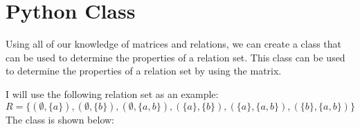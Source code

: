 \section{Python Class}

Using all of our knowledge of matrices and relations, we can create a class that can be used to determine the properties of a relation set. This class can be used to determine the properties of a relation set by using the matrix. 

I will use the following relation set as an example: \\

$R = \{(\emptyset ,\{a\}),(\emptyset,\{b\}),(\emptyset,\{a,b\}),(\{ a\} ,\{ b\}),(\{a\},\{a,b\}),(\{b\},\{a,b\})\}$ \\


The class is shown below:


